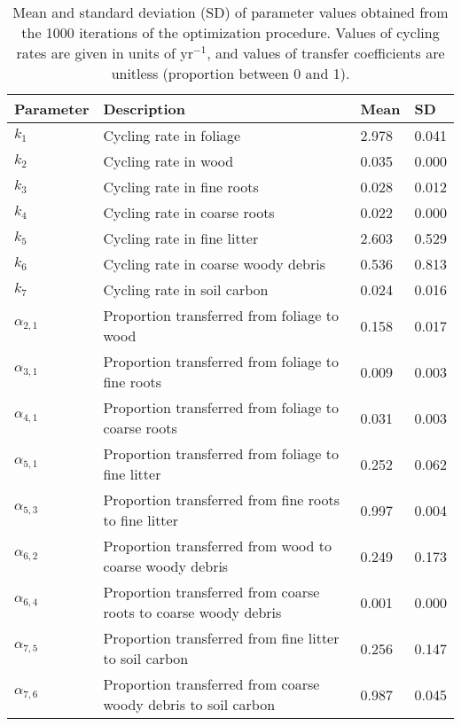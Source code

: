 \begin{table}[ht]
\centering
\caption{Mean and standard deviation (SD) of parameter values obtained from the 1000 iterations of the optimization procedure.
             Values of cycling rates are given in units of yr$^{-1}$, and values of transfer coefficients are unitless (proportion between
             0 and 1).} 
\label{tab:parstats}
\begin{tabular}{llll}
  \toprule
Parameter & Description & Mean & SD \\ 
  \midrule
$k_1$ & Cycling rate in foliage & 2.978 & 0.041 \\ 
  $k_2$ & Cycling rate in wood & 0.035 & 0.000 \\ 
  $k_3$ & Cycling rate in fine roots & 0.028 & 0.012 \\ 
  $k_4$ & Cycling rate in coarse roots & 0.022 & 0.000 \\ 
  $k_5$ & Cycling rate in fine litter & 2.603 & 0.529 \\ 
  $k_6$ & Cycling rate in coarse woody debris & 0.536 & 0.813 \\ 
  $k_7$ & Cycling rate in soil carbon & 0.024 & 0.016 \\ 
  $\alpha_{2,1}$ & Proportion transferred from foliage to wood & 0.158 & 0.017 \\ 
  $\alpha_{3,1}$ & Proportion transferred from foliage to fine roots & 0.009 & 0.003 \\ 
  $\alpha_{4,1}$ & Proportion transferred from foliage to coarse roots & 0.031 & 0.003 \\ 
  $\alpha_{5,1}$ & Proportion transferred from foliage to fine litter & 0.252 & 0.062 \\ 
  $\alpha_{5,3}$ & Proportion transferred from fine roots to fine litter & 0.997 & 0.004 \\ 
  $\alpha_{6,2}$ & Proportion transferred from wood to coarse woody debris & 0.249 & 0.173 \\ 
  $\alpha_{6,4}$ & Proportion transferred from coarse roots to coarse woody debris & 0.001 & 0.000 \\ 
  $\alpha_{7,5}$ & Proportion transferred from fine litter to soil carbon & 0.256 & 0.147 \\ 
  $\alpha_{7,6}$ & Proportion transferred from coarse woody debris to soil carbon & 0.987 & 0.045 \\ 
   \bottomrule
\end{tabular}
\end{table}
